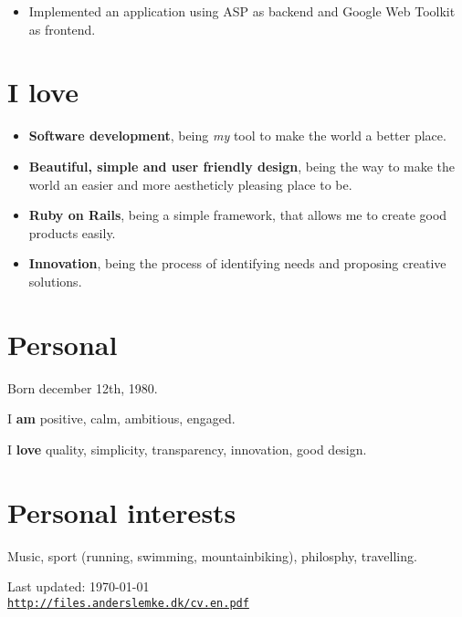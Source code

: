 \documentclass[a4paper]{article}
\begin{document}
\begin{itemize}
	\item Implemented an application using ASP as backend and Google Web Toolkit as frontend.
\end{itemize}

\section*{I love}

\begin{itemize}
  \item \textbf{Software development}, being \emph{my} tool to make the world a better place.
  \item \textbf{Beautiful, simple and user friendly design}, being the way to make the world an easier and more aestheticly  pleasing place to be.
  \item \textbf{Ruby on Rails}, being a simple framework, that allows me to create good products easily.
  \item \textbf{Innovation}, being the process of identifying needs and proposing creative solutions.
\end{itemize}


\section*{Personal}
Born december 12th, 1980.

I \textbf{am} positive, calm, ambitious, engaged.

I \textbf{love} quality, simplicity, transparency, innovation, good design.

\section*{Personal interests} 

Music, sport (running, swimming, mountainbiking), philosphy, travelling.


\bigskip

\begin{center}
\begin{footnotesize}
Last updated: \today \\
\href{http://files.anderslemke.dk/cv.en.pdf}{\tt http://files.anderslemke.dk/cv.en.pdf}
\end{footnotesize}
\end{center}
\end{document}
